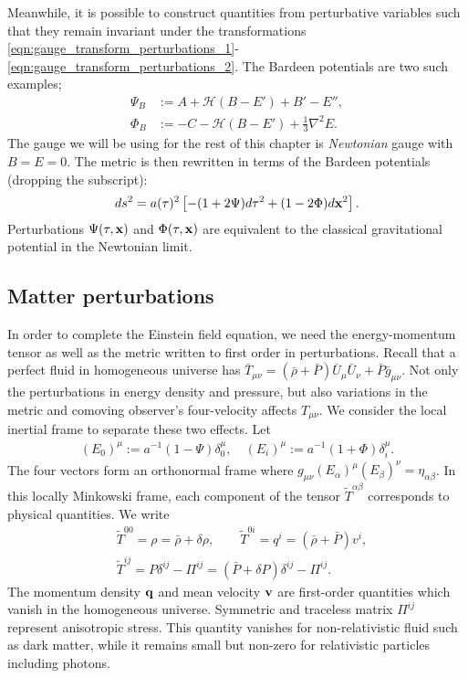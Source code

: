 Meanwhile, it is possible to construct quantities from perturbative variables such that they remain invariant under the transformations \eqref{eqn:gauge_transform_perturbations_1}-\eqref{eqn:gauge_transform_perturbations_2}. The Bardeen potentials are two such examples;
\begin{align}
	\Psi_B &:= A + \mathcal{H}(B-E') + B' - E'', \\
	\Phi_B &:= -C - \mathcal{H}(B-E') + \frac{1}{3}\nabla^2 E.
\end{align}
The gauge we will be using for the rest of this chapter is \textit{Newtonian} gauge with $B=E=0$. The metric is then rewritten in terms of the Bardeen potentials (dropping the subscript):
\begin{align}
	ds^2 = a(\tau)^2 \left[ -(1 + 2\Psi) d\tau^2 + (1-2\Phi) d\mathbf{x}^2  \right]. \label{eqn:perturbed_metric_newtonian_gauge}
\end{align}
Perturbations $\Psi(\tau,\mathbf{x})$ and $\Phi(\tau,\mathbf{x})$ are equivalent to the classical gravitational potential in the Newtonian limit.


\subsection{Matter perturbations}

In order to complete the Einstein field equation, we need the energy-momentum tensor as well as the metric written to first order in perturbations. Recall that a perfect fluid in homogeneous universe has $\bar{T}_{\mu\nu} = (\bar{\rho} + \bar{P}) \bar{U}_\mu \bar{U}_\nu + \bar{P} \bar{g}_{\mu\nu}$. Not only the perturbations in energy density and pressure, but also variations in the metric and comoving observer's four-velocity affects $T_{\mu\nu}$. We consider the local inertial frame to separate these two effects. Let
\begin{align}
	(E_0)^\mu := a^{-1} (1 - \Psi) \delta^\mu_0, \quad (E_i)^\mu := a^{-1} (1 + \Phi) \delta^\mu_i. \label{eqn:newtonian_gauge_tetrad}
\end{align}
The four vectors form an orthonormal frame where $g_{\mu\nu}(E_\alpha)^\mu (E_\beta)^\nu = \eta_{\alpha\beta}$. In this locally Minkowski frame, each component of the tensor $\tilde{T}^{\alpha\beta}$ corresponds to physical quantities. We write
\begin{align}
	&\tilde{T}^{00} = \rho = \bar{\rho} + \delta\rho, \qquad \tilde{T}^{0i} = q^i = (\bar{\rho}+\bar{P})v^i, \\
	&\tilde{T}^{ij} = P \delta^{ij} - \Pi^{ij} = (\bar{P} + \delta P) \delta^{ij} - \Pi^{ij}.
\end{align}
The momentum density $\mathbf{q}$ and mean velocity $\mathbf{v}$ are first-order quantities which vanish in the homogeneous universe. Symmetric and traceless matrix $\Pi^{ij}$ represent anisotropic stress. This quantity vanishes for non-relativistic fluid such as dark matter, while it remains small but non-zero for relativistic particles including photons.

